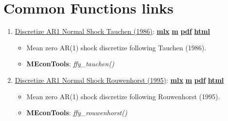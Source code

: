 \documentclass[
]{book}
\providecommand{\tightlist}{%
  \setlength{\itemsep}{0pt}\setlength{\parskip}{0pt}}
\begin{document}
\hypertarget{common-functions-links}{%
\section{Common Functions links}\label{common-functions-links}}

\begin{enumerate}
\def\labelenumi{\arabic{enumi}.}
\tightlist
\item
  \href{https://fanwangecon.github.io/MEconTools/MEconTools/doc/external/htmlpdfm/fxy_tauchen.html}{Discretize AR1 Normal Shock Tauchen (1986)}: \href{https://github.com/FanWangEcon/MEconTools/blob/master/MEconTools/doc/external/fxy_tauchen.mlx}{\textbf{mlx}} \textbar{} \href{https://github.com/FanWangEcon/MEconTools/blob/master/MEconTools/doc/external/htmlpdfm/fxy_tauchen.m}{\textbf{m}} \textbar{} \href{https://github.com/FanWangEcon/MEconTools/blob/master/MEconTools/doc/external/htmlpdfm/fxy_tauchen.pdf}{\textbf{pdf}} \textbar{} \href{https://fanwangecon.github.io/MEconTools/MEconTools/doc/external/htmlpdfm/fxy_tauchen.html}{\textbf{html}}

  \begin{itemize}
  \tightlist
  \item
    Mean zero AR(1) shock discretize following Tauchen (1986).
  \item
    \textbf{MEconTools}: \emph{ffy\_tauchen()}
  \end{itemize}
\item
  \href{https://fanwangecon.github.io/MEconTools/MEconTools/doc/external/htmlpdfm/fxy_rouwenhorst.html}{Discretize AR1 Normal Shock Rouwenhorst (1995)}: \href{https://github.com/FanWangEcon/MEconTools/blob/master/MEconTools/doc/external/fxy_rouwenhorst.mlx}{\textbf{mlx}} \textbar{} \href{https://github.com/FanWangEcon/MEconTools/blob/master/MEconTools/doc/external/htmlpdfm/fxy_rouwenhorst.m}{\textbf{m}} \textbar{} \href{https://github.com/FanWangEcon/MEconTools/blob/master/MEconTools/doc/external/htmlpdfm/fxy_rouwenhorst.pdf}{\textbf{pdf}} \textbar{} \href{https://fanwangecon.github.io/MEconTools/MEconTools/doc/external/htmlpdfm/fxy_rouwenhorst.html}{\textbf{html}}

  \begin{itemize}
  \tightlist
  \item
    Mean zero AR(1) shock discretize following Rouwenhorst (1995).
  \item
    \textbf{MEconTools}: \emph{ffy\_rouwenhorst()}
  \end{itemize}
\end{enumerate}
\end{document}
